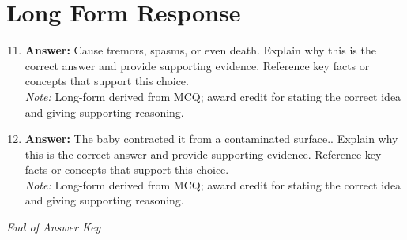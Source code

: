 \documentclass[12pt]{article}
\begin{document}
\section*{Long Form Response}
\begin{enumerate}[label=\arabic*.]
\setcounter{enumi}{10}
\item \textbf{Answer:} Cause tremors, spasms, or even death. Explain why this is the correct answer and provide supporting evidence. Reference key facts or concepts that support this choice.
\\ \textit{Note:} Long-form derived from MCQ; award credit for stating the correct idea and giving supporting reasoning.
\item \textbf{Answer:} The baby contracted it from a contaminated surface.. Explain why this is the correct answer and provide supporting evidence. Reference key facts or concepts that support this choice.
\\ \textit{Note:} Long-form derived from MCQ; award credit for stating the correct idea and giving supporting reasoning.
\end{enumerate}

\vfill
\noindent\textit{End of Answer Key}
\end{document}
